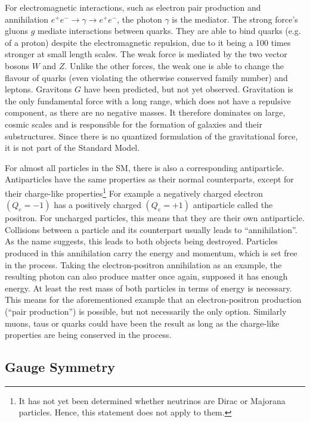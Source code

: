 For electromagnetic interactions, such as electron pair production and annihilation $e^+ e^- \rightarrow \gamma \rightarrow e^+ e^-$, the photon $\gamma$ is the mediator. The strong force's gluons $g$ mediate interactions between quarks. They are able to bind quarks (e.g. of a proton) despite the electromagnetic repulsion, due to it being a 100 times stronger at small length scales. The weak force is mediated by the two vector bosons $W$ and $Z$. Unlike the other forces, the weak one is able to change the flavour of quarks (even violating the otherwise conserved family number) and leptons. Gravitons $G$ have been predicted, but not yet observed. Gravitation is the only fundamental force with a long range, which does not have a repulsive component, as there are no negative masses. It therefore dominates on large, cosmic scales and is responsible for the formation of galaxies and their substructures. Since there is no quantized formulation of the gravitational force, it is not part of the Standard Model.

For almost all particles in the SM, there is also a corresponding antiparticle. Antiparticles have the same properties as their normal counterparts, except for their charge-like properties\footnote{It has not yet been determined whether neutrinos are Dirac or Majorana particles. Hence, this statement does not apply to them.} For example a negatively charged electron $(Q_e = -1)$ has a positively charged $(Q_e = +1)$ antiparticle called the positron. For uncharged particles, this means that they are their own antiparticle. Collisions between a particle and its counterpart usually leads to ``annihilation''. As the name suggests, this leads to both objects being destroyed. Particles produced in this annihilation carry the energy and momentum, which is set free in the process. Taking the electron-positron annihilation as an example, the resulting photon can also produce matter once again, supposed it has enough energy. At least the rest mass of both particles in terms of energy is necessary. This means for the aforementioned example that an electron-positron production (``pair production'') is possible, but not necessarily the only option. Similarly muons, taus or quarks could have been the result as long as the charge-like properties are being conserved in the process.


\subsection{Gauge Symmetry}

